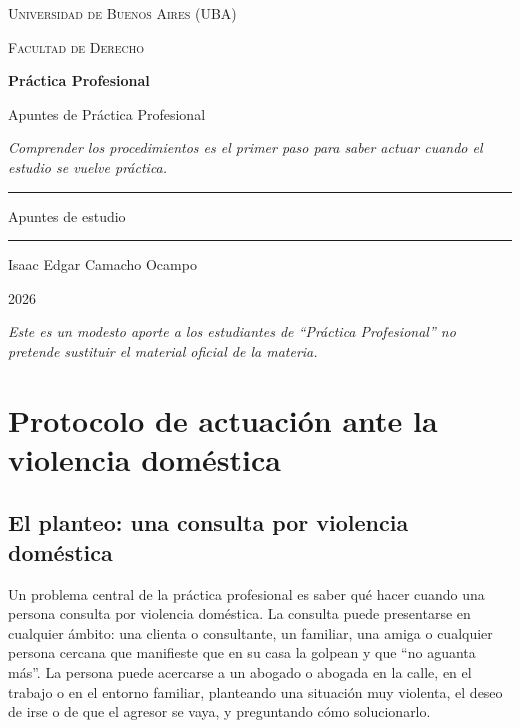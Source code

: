 \documentclass[12pt,oneside]{book}
\newcommand{\universidad}{Universidad de Buenos Aires (UBA)}
\newcommand{\facultad}{Facultad de Derecho}
\newcommand{\materia}{Práctica Profesional}
\newcommand{\titulo}{Apuntes de Práctica Profesional}
\newcommand{\autor}{Isaac Edgar Camacho Ocampo}
\newcommand{\anio}{2026}
\begin{document}
\begin{titlepage}
\thispagestyle{empty}
\begin{center}
\vspace*{1cm}
{\large \textsc{\universidad}}

\vspace{0.2cm}
{\large \textsc{\facultad}}

\vspace{3cm}
{\Huge \textbf{\materia}}

\vspace{1cm}
{\LARGE \titulo}

\vspace{0.8cm}
\textit{Comprender los procedimientos es el primer paso para saber actuar cuando el estudio se vuelve práctica.}

\vspace{1.2cm}
\rule{0.70\textwidth}{0.5pt}

\vspace{0.5cm}
{\large Apuntes de estudio}

\vspace{0.5cm}
\rule{0.70\textwidth}{0.5pt}

\vfill
{\large \autor}

\vspace{0.3cm}
{\large \anio}
\end{center}

\vfill
\begin{flushleft}
\textit{Este es un modesto aporte a los estudiantes de ``\materia'' no pretende sustituir el material oficial de la materia.}
\end{flushleft}
\end{titlepage}

\tableofcontents
\clearpage

\chapter[Violencia doméstica]{Protocolo de actuación ante la violencia doméstica}

\section{El planteo: una consulta por violencia doméstica}

Un problema central de la práctica profesional es saber qué hacer cuando una persona consulta por violencia doméstica. La consulta puede presentarse en cualquier ámbito: una clienta o consultante, un familiar, una amiga o cualquier persona cercana que manifieste que en su casa la golpean y que ``no aguanta más''. La persona puede acercarse a un abogado o abogada en la calle, en el trabajo o en el entorno familiar, planteando una situación muy violenta, el deseo de irse o de que el agresor se vaya, y preguntando cómo solucionarlo.
\end{document}
